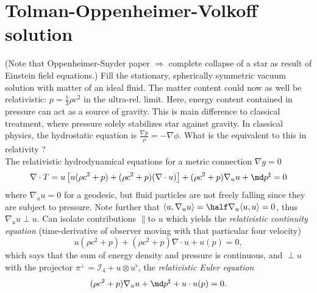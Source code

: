 \section{Tolman-Oppenheimer-Volkoff solution}
	(Note that Oppenheimer-Snyder paper $\Rightarrow$ complete collapse of a star as result of Einstein field equations.)
	Fill the stationary, spherically symmetric vacuum solution with matter of an ideal fluid. The matter content could now as well be relativistic: $p=\frac{1}{3} \rho c^2$ in the ultra-rel. limit. Here, energy content contained in pressure can act as a source of gravity. This is main difference to classical treatment, where pressure solely stabilizes star against gravity. In classical physics, the hydrostatic equation is $\frac{\nabla p}{\rho} = - \nabla \phi$. What is the equivalent to this in relativity ?
	\\
	The relativistic hydrodynamical equations for a metric connection $\nabla g=0$ 
	\begin{equation}
		\nabla \cdot T= u \left[u(\rho c^2 + p) + (\rho c^2+p) (\nabla \cdot u) \right] + (\rho c^2 + p) \nabla_u u+ \md p^{\sharp} = 0
	\end{equation}
	where $\nabla_u u=0$ for a geodesic, but fluid particles are not freely falling since they are subject to pressure. Note further that $\langle u, \nabla_u u\rangle = \half \nabla_u \langle u,u \rangle =0$, thus $\nabla_u u \perp u$. Can isolate contributions $\parallel$to $u$ which yields the \emph{relativistic continuity equation} (time-derivative of observer moving with that particular four velocity)
\begin{equation}
	u(\rho c^2 +p) + (\rho c^2+p) \nabla \cdot u + u(p) = 0,
\end{equation}	
which says that the sum of energy density and pressure is continuous, and $\perp u$ with the projector $\pi^{\perp} = \mathcal{I}_4 + u \otimes u^{\flat}$, the \emph{relativistic Euler equation}
\begin{equation}
	(\rho c^2+p) \nabla_u u + \md p^{\sharp} + u \cdot u(p) = 0.
\end{equation}
